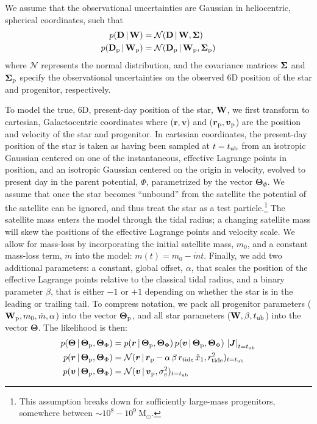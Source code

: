 \documentclass[letterpaper,12pt,preprint]{aastex}
\newcommand{\given}{\,|\,}
\newcommand{\D}{{\bf D}}
\newcommand{\W}{{\bf W}}
\newcommand{\J}{{\boldsymbol J}}
\newcommand{\bSigma}{{\bf \Sigma}}
\newcommand{\rtide}{r_{\rm tide}}
\newcommand{\bs}{\boldsymbol}
\newcommand{\sat}{{\rm p}}
\newcommand{\tub}{t_{\rm ub}}
\newcommand{\tailbit}{\beta}
\newcommand{\Loffset}{\alpha}
\begin{document}
We assume that the observational uncertainties are Gaussian in heliocentric, spherical coordinates, such that
\begin{align}
	p(\D \given \W) &= \mathcal{N}(\D \given \W, \bSigma)\label{eq:obsstar}\\
	p(\D_\sat \given \W_\sat) &= \mathcal{N}(\D_\sat \given \W_\sat, \bSigma_\sat)\label{eq:obsprog}
\end{align}
where $\mathcal{N}$ represents the normal distribution, and the covariance matrices $\bSigma$ and $\bSigma_\sat$ specify the observational uncertainties on the observed 6D position of the star and progenitor, respectively. 

To model the true, 6D, present-day position of the star, $\W$, we first transform to cartesian, Galactocentric coordinates where ($\bs{r},\bs{v}$) and ($\bs{r}_\sat,\bs{v}_\sat$) are the position and velocity of the star and progenitor. In cartesian coordinates, the present-day position of the star is taken as having been sampled at $t=\tub$ from an isotropic Gaussian centered on one of the instantaneous, effective Lagrange points in position, and an isotropic Gaussian centered on the origin in velocity, evolved to present day in the parent potential, $\Phi$, parametrized by the vector $\bs{\Theta}_\Phi$. We assume that once the star becomes ``unbound'' from the satellite the potential of the satellite can be ignored, and thus treat the star as a test particle.\footnote{This assumption breaks down for sufficiently large-mass progenitors, somewhere between $\sim10^8-10^9~$M$_\odot$.} The satellite mass enters the model through the tidal radius; a changing satellite mass will skew the positions of the effective Lagrange points and velocity scale. We allow for mass-loss by incorporating the initial satellite mass, $m_0$, and a constant mass-loss term, $\dot{m}$ into the model: $m(t) = m_0 - \dot{m}t$. Finally, we add two additional parameters: a constant, global offset, $\Loffset$, that scales the position of the effective Lagrange points relative to the classical tidal radius, and a binary parameter $\tailbit$, that is either $-1$ or $+1$ depending on whether the star is in the leading or trailing tail. To compress notation, we pack all progenitor parameters ($\W_\sat, m_0, \dot{m}, \Loffset$) into the vector $\bs{\Theta}_\sat$, and all star parameters ($\W, \tailbit, \tub$) into the vector $\bs{\Theta}$. The likelihood is then:
\begin{align}
	p(\bs{\Theta} \given \bs{\Theta}_\sat, \bs{\Theta}_\Phi) &= p(\bs{r} \given \bs{\Theta}_\sat, \bs{\Theta}_\Phi)\,p(\bs{v} \given\bs{\Theta}_\sat, \bs{\Theta}_\Phi)\,\left\vert\J\right\vert_{t=\tub}\\
	p(\bs{r} \given \bs{\Theta}_\sat, \bs{\Theta}_\Phi) &= \mathcal{N}(\bs{r} \given \bs{r}_\sat - \Loffset\,\tailbit\,\rtide\,\hat{x}_1, \rtide^2)_{t=\tub}\\
	p(\bs{v} \given \bs{\Theta}_\sat, \bs{\Theta}_\Phi) &= \mathcal{N}(\bs{v} \given \bs{v}_\sat, \sigma^2_v)_{t=\tub}
\end{align}
\end{document}
